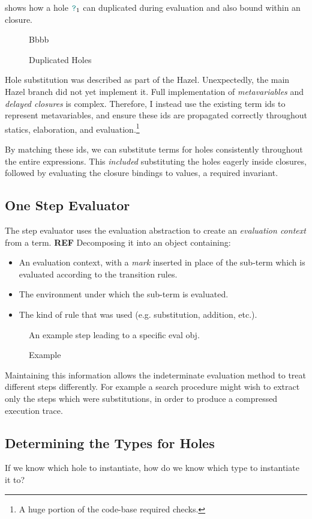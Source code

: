  shows how a hole ${\color{teal}\texttt{?}}_1$ can duplicated during evaluation and also bound within an closure.
\begin{figure}[h]
Bbbb
\caption{Duplicated Holes}
\label{fig:HoleDuplication}
\end{figure}

Hole substitution was described as part of the Hazel. Unexpectedly, the main Hazel branch did not yet implement it. Full implementation of \textit{metavariables} and \textit{delayed closures} is complex. Therefore, I instead use the existing term ids to represent metavariables, and ensure these ids are propagated correctly throughout statics, elaboration, and evaluation.\footnote{A huge portion of the code-base required checks.}

By matching these ids, we can substitute terms for holes consistently throughout the entire expressions. This \textit{included} substituting the holes eagerly inside closures, followed by evaluating the closure bindings to values, a required invariant. 

\subsection{One Step Evaluator}\label{sec:OneStepEvaluator}
The step evaluator uses the evaluation abstraction to create an \textit{evaluation context} from a term. \textbf{REF} Decomposing it into an object containing:
\begin{itemize}
\item An evaluation context, with a \textit{mark} inserted in place of the sub-term which is evaluated according to the transition rules.
\item The environment under which the sub-term is evaluated.
\item The kind of rule that was used (e.g. substitution, addition, etc.).
\end{itemize}

\begin{figure}
An example step leading to a specific eval obj.
\caption{ Example}
\label{fig:EvalObjExample)}
\end{figure}

Maintaining this information allows the indeterminate evaluation method to treat different steps differently. For example a search procedure might wish to extract only the steps which were substitutions, in order to produce a compressed execution trace.

\subsection{Determining the Types for Holes}
\label{sec:TypesForHoles}
If we know which hole to instantiate, how do we know which type to instantiate it to?


